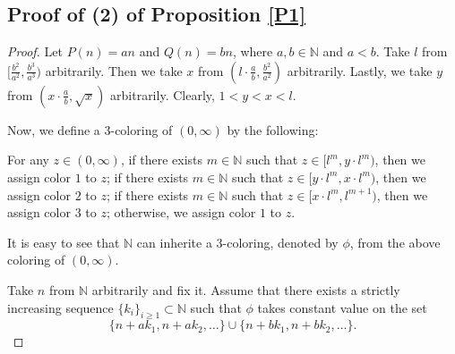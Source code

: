 \documentclass[reqno,12pt]{amsart}
\def \N {\mathbb N}
\numberwithin{equation}{section}
\begin{document}
\subsection{Proof of (2) of Proposition \ref{P1}}
\begin{proof}
	Let $P(n)=an$ and $Q(n)=bn$, where $a,b\in \N$ and $a<b$. Take $l$ from $[\frac{b^2}{a^2},\frac{b^3}{a^3})$ arbitrarily. Then we take $x$ from $(l\cdot\frac{a}{b},\frac{b^2}{a^2})$ arbitrarily. Lastly, we take $y$ from $(x\cdot \frac{a}{b},\sqrt{x})$ arbitrarily. Clearly, $1<y<x<l$.
	
	Now, we define a $3$-coloring of $(0,\infty)$ by the following:
	
	For any $z\in (0,\infty)$, if  there exists $m\in \N$ such that $z\in [l^{m},y\cdot l^{m})$, then we assign color $1$ to $z$; if there exists $m\in \N$ such that $z\in [y\cdot l^{m},x\cdot l^{m})$, then we assign color $2$ to $z$; if there exists $m\in \N$ such that $z\in [x\cdot l^{m},l^{m+1})$, then we assign color $3$ to $z$; otherwise, we assign color $1$ to $z$.
	
	It is easy to see that $\N$ can inherite a $3$-coloring, denoted by $\phi$, from the above coloring of $(0,\infty)$.
	
	Take $n$ from $\N$ arbitrarily and fix it.  Assume that there exists a strictly increasing sequence $\{k_i\}_{i\ge 1}\subset \N$ such that $\phi$ takes constant value on the set $$\{n+ak_1,n+ak_2,\ldots\}\cup \{n+bk_1,n+bk_2,\ldots\}.$$
	

\end{proof}
\end{document}
